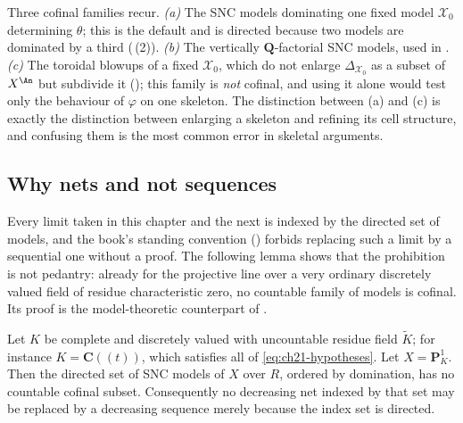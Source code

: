 \begin{remark}
\label{rem:ch21-cofinal-families}
Three cofinal families recur.  \emph{(a)} The SNC models dominating one
fixed model \(\mathcal X_0\) determining \(\theta\); this is the default and
is directed because two models are dominated by a third
(\,(2)).  \emph{(b)} The vertically
\(\mathbf Q\)-factorial SNC models, used in
.  \emph{(c)} The toroidal blowups of a fixed
\(\mathcal X_0\), which do not enlarge \(\Delta_{\mathcal X_0}\) as a subset
of \(X^{\An}\) but subdivide it (); this
family is \emph{not} cofinal, and using it alone would test only the
behaviour of \(\varphi\) on one skeleton.  The distinction between (a) and
(c) is exactly the distinction between enlarging a skeleton and refining
its cell structure, and confusing them is the most common error in
skeletal arguments.
\end{remark}

\subsection{Why nets and not sequences}
\label{sec:ch21-nets}

Every limit taken in this chapter and the next is indexed by the directed
set of models, and the book's standing convention
() forbids replacing such a limit by a
sequential one without a proof.  The following lemma shows that the
prohibition is not pedantry: already for the projective line over a very
ordinary discretely valued field of residue characteristic zero, no
countable family of models is cofinal.  Its proof is the model-theoretic
counterpart of .

\begin{lemma}
\label{lem:ch21-no-cofinal-sequence}
Let \(K\) be complete and discretely valued with uncountable residue field
\(\widetilde K\); for instance \(K=\mathbf C((t))\), which satisfies all of
\eqref{eq:ch21-hypotheses}.  Let \(X=\mathbf P^1_K\).  Then the directed set
of SNC models of \(X\) over \(R\), ordered by domination, has no countable
cofinal subset.  Consequently no decreasing net indexed by that set may be
replaced by a decreasing sequence merely because the index set is directed.
\end{lemma}

